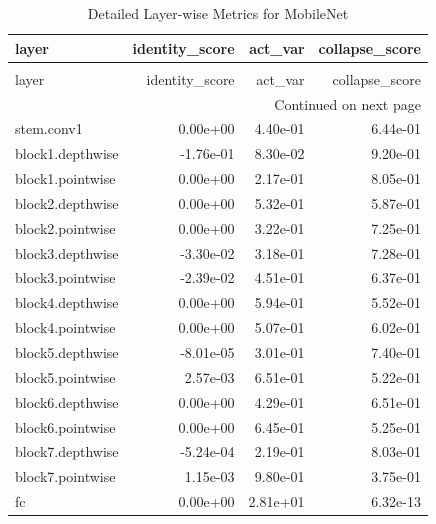 \begin{longtable}{lrrr}
\caption{Detailed Layer-wise Metrics for MobileNet} \label{tab:layer_metrics_mobilenet} \\
\toprule
layer & identity_score & act_var & collapse_score \\
\midrule
\endfirsthead
\caption[]{Detailed Layer-wise Metrics for MobileNet} \\
\toprule
layer & identity_score & act_var & collapse_score \\
\midrule
\endhead
\midrule
\multicolumn{4}{r}{Continued on next page} \\
\midrule
\endfoot
\bottomrule
\endlastfoot
stem.conv1 & 0.00e+00 & 4.40e-01 & 6.44e-01 \\
block1.depthwise & -1.76e-01 & 8.30e-02 & 9.20e-01 \\
block1.pointwise & 0.00e+00 & 2.17e-01 & 8.05e-01 \\
block2.depthwise & 0.00e+00 & 5.32e-01 & 5.87e-01 \\
block2.pointwise & 0.00e+00 & 3.22e-01 & 7.25e-01 \\
block3.depthwise & -3.30e-02 & 3.18e-01 & 7.28e-01 \\
block3.pointwise & -2.39e-02 & 4.51e-01 & 6.37e-01 \\
block4.depthwise & 0.00e+00 & 5.94e-01 & 5.52e-01 \\
block4.pointwise & 0.00e+00 & 5.07e-01 & 6.02e-01 \\
block5.depthwise & -8.01e-05 & 3.01e-01 & 7.40e-01 \\
block5.pointwise & 2.57e-03 & 6.51e-01 & 5.22e-01 \\
block6.depthwise & 0.00e+00 & 4.29e-01 & 6.51e-01 \\
block6.pointwise & 0.00e+00 & 6.45e-01 & 5.25e-01 \\
block7.depthwise & -5.24e-04 & 2.19e-01 & 8.03e-01 \\
block7.pointwise & 1.15e-03 & 9.80e-01 & 3.75e-01 \\
fc & 0.00e+00 & 2.81e+01 & 6.32e-13 \\
\end{longtable}
